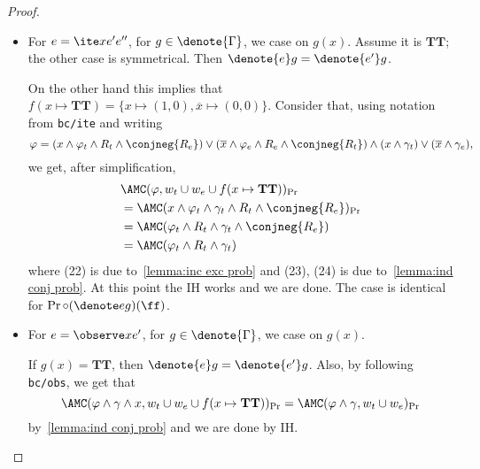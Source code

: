 \begin{proof}
\begin{itemize}[leftmargin=*]
    \item For $e = \ite x {e'} {e''}$, for $g \in \denote{\Gamma}$, we case on $g(x)$. Assume it is $\mathbf{TT}$; the other case is symmetrical. Then 
    $\denote{e} g = \denote{e'} g$. 

    On the other hand this implies that $f(x \mapsto \mathbf{TT}) = \{x \mapsto (1,0), \overline x \mapsto (0,0)\}$. Consider that, using notation from \texttt{bc/ite}
    and writing 
    $$\varphi = (x \land \varphi_t \land R_t \land \conjneg{R_e}) 
            \lor (\overline{x} \land \varphi_e \land R_e \land \conjneg{R_t})
            \land (x \land \gamma_t) \lor (\overline x \land \gamma_e),$$
    we get, after simplification,
    \begin{align}
      &\AMC(\varphi, w_t \cup w_e \cup f(x \mapsto \mathbf{TT}))_{\Pr} \\
      &=\AMC(x \land \varphi_t \land \gamma_t \land R_t \land \conjneg{R_e})_{\Pr} \\
      &=\AMC(\varphi_t \land R_t \land \gamma_t \land \conjneg{R_e} ) \\
      &=\AMC(\varphi_t \land R_t \land \gamma_t)
    \end{align}
    where (22) is due to~\cref{lemma:inc exc prob} and (23), (24) is due to~\cref{lemma:ind conj prob}. At this point the IH works and we are done. The case is identical for $\Pr \circ (\denote e g)  (\ff)$.

  \item For $e = \observe x {e'}$, for $g \in \denote{\Gamma}$, we case on $g(x)$.
 
  If $g(x) = \mathbf{TT}$, then $\denote{e} g = \denote{e'} g$. Also, by following \texttt{bc/obs}, we get that 
      $$\AMC(\varphi \land \gamma \land x, w_t \cup w_e \cup f(x \mapsto \mathbf{TT}))_{\Pr}
      =\AMC(\varphi \land \gamma, w_t \cup w_e)_{\Pr}$$
      by~\cref{lemma:ind conj prob} and we are done by IH.


\end{itemize}
\end{proof}
